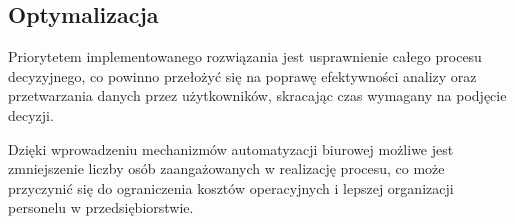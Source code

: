 \subsection{Optymalizacja}
Priorytetem implementowanego rozwiązania jest usprawnienie całego procesu decyzyjnego, co powinno przełożyć się na poprawę efektywności analizy oraz przetwarzania danych przez użytkowników, skracając czas wymagany na podjęcie decyzji.

Dzięki wprowadzeniu mechanizmów automatyzacji biurowej możliwe jest zmniejszenie liczby osób zaangażowanych w realizację procesu, co może przyczynić się do ograniczenia kosztów operacyjnych i lepszej organizacji personelu w przedsiębiorstwie.

\begin{comment}
Priorytetem implementowanego rozwiązania jest usprawnienie całego procesu decyzyjnego. Głównym elementem jest redukcja czasu wymaganego na realizację poszczególnych zadań, co osiągnięto dzięki wprowadzeniu mechanizmów automatyzacji biurowej. Ważnym aspektem jest również poprawa efektywności analizy oraz przetwarzania danych przez użytkowników, umożliwiając podejmowanie bardziej trafnych decyzji w krótszym czasie.

Zmniejszenie liczby osób zaangażowanych w realizację procesu umożliwia optymalizację wykorzystania zasobów ludzkich. Dzięki temu możliwe jest ograniczenie kosztów operacyjnych i bardziej efektywne zarządzanie personelem, co przyczynia się do zwiększenia ogólnej wydajności przedsiębiorstwa.
\end{comment}